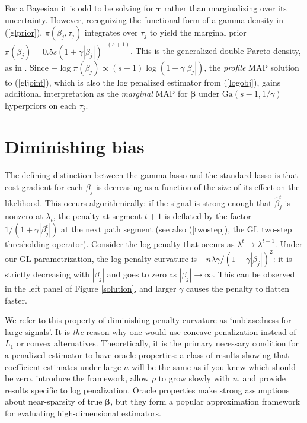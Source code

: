 \documentclass[12pt]{article}
\newcommand{\bs}[1]{\boldsymbol{#1}}
\newcommand{\mr}[1]{\mathrm{#1}}
\begin{document}
For a Bayesian it is odd to be solving for $\bs{\tau}$ rather than
marginalizing over its uncertainty.  However, recognizing the functional form
of a gamma density  in (\ref{glprior}), $\pi(\beta_j,\tau_j)$ integrates over
$\tau_j$ to yield the marginal prior $ \pi(\beta_j) = 0.5s\left( 1+
\gamma|\beta_j|\right)^{-(s+1)}$. This is the generalized double Pareto
density, as in  \citet{armagan_generalized_2013}. Since $-\log \pi(\beta_j)
\propto (s+1)\log(1 + \gamma|\beta_j|)$, the {\it profile} MAP solution to
(\ref{gljoint}), which is also the log penalized estimator from
(\ref{logobj}), gains additional interpretation as the {\it marginal} MAP for
$\bs{\beta}$ under $\mr{Ga}(s-1,1/\gamma)$ hyperpriors on each $\tau_j$.

\section{Diminishing bias}
\label{concave}

The defining distinction between the gamma lasso and the standard lasso is
that cost gradient for each $\beta_j$ is decreasing as a function of the size
of its effect  on the likelihood. This occurs algorithmically: if the signal
is strong enough that $\hat \beta^t_j$ is nonzero at $\lambda_t$,  the penalty
at segment $t+1$ is deflated by the factor $1/(1+ \gamma|\beta^t_j|)$ at the
next path segment (see also (\ref{twostep}), the GL two-step thresholding
operator). Consider the log penalty that occurs as $\lambda^t \rightarrow
\lambda^{t-1}$. Under our GL parametrization, the log penalty curvature is
$-n\lambda\gamma/(1+\gamma|\beta_j|)^2$: it is strictly decreasing with
$|\beta_j|$ and goes to zero as $|\beta_j| \rightarrow \infty$. This can be
observed in the left panel of Figure \ref{solution}, and larger $\gamma$
causes the penalty to flatten faster.


We refer to this property of diminishing penalty curvature as `unbiasedness
for large signals'. It is {\it the} reason why one would use concave
penalization instead of $L_1$ or convex alternatives.  Theoretically, it is
the primary necessary condition for a penalized estimator to have
oracle properties: a class of results showing that coefficient
estimates under large $n$ will be the same as if you knew which
should be zero.  \citet{fan_variable_2001} introduce the framework,
\citet{fan_nonconcave_2004} allow $p$ to grow slowly with $n$, 
and \citet{armagan_posterior_2013} provide results specific to log penalization.
Oracle properties make strong assumptions
about near-sparsity of true $\bs{\beta}$, but they form a popular
 approximation framework for evaluating  
high-dimensional estimators. 
\end{document}

